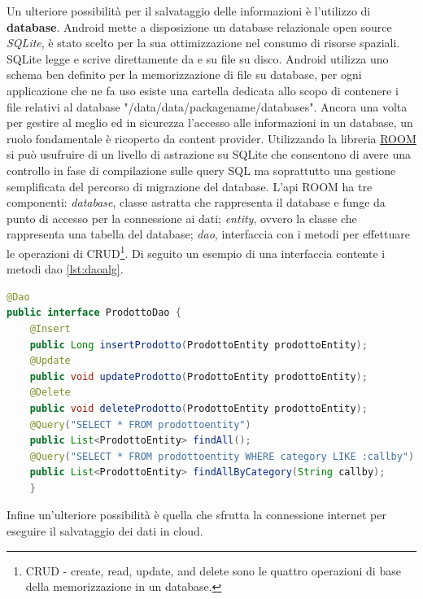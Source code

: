 Un ulteriore possibilità per il salvataggio delle informazioni è l'utilizzo di \textbf{database}. Android mette a disposizione un database relazionale open source \textit{SQLite}, è stato scelto per la sua ottimizzazione nel consumo di risorse spaziali. SQLite legge e scrive direttamente da e su file su disco. Android utilizza uno schema ben definito per la memorizzazione di file su database, per ogni applicazione che ne fa uso esiste una cartella dedicata allo scopo di contenere i file relativi al database "/data/data/packagename/databases". Ancora una volta per gestire al meglio ed in sicurezza l'accesso alle informazioni in un database, un ruolo fondamentale è ricoperto da content provider. Utilizzando la libreria \href{https://developer.android.com/training/data-storage/room}{ROOM} si può usufruire di un livello di astrazione su SQLite che consentono di avere una controllo in fase di compilazione sulle query SQL ma soprattutto una gestione semplificata del percorso di migrazione del database. L'api ROOM ha tre componenti: \textit{database}, classe astratta che rappresenta il database e funge da punto di accesso per la connessione ai dati; \textit{entity}, ovvero la classe che rappresenta una tabella del database; \textit{dao}, interfaccia con i metodi per effettuare le operazioni di CRUD\footnote{CRUD - create, read, update, and delete sono le quattro operazioni di base della memorizzazione in un database.}. Di seguito un esempio di una interfaccia contente i metodi dao \ref{lst:daoalg}.
\begin{lstlisting}[language=Java, caption=Dao example, label = lst:daoalg]
@Dao
public interface ProdottoDao {
    @Insert
    public Long insertProdotto(ProdottoEntity prodottoEntity);
    @Update
    public void updateProdotto(ProdottoEntity prodottoEntity);
    @Delete
    public void deleteProdotto(ProdottoEntity prodottoEntity);
    @Query("SELECT * FROM prodottoentity")
    public List<ProdottoEntity> findAll();
    @Query("SELECT * FROM prodottoentity WHERE category LIKE :callby")
    public List<ProdottoEntity> findAllByCategory(String callby);
    }
\end{lstlisting}
Infine un'ulteriore possibilità è quella che sfrutta la connessione internet per eseguire il salvataggio dei dati in cloud. 


